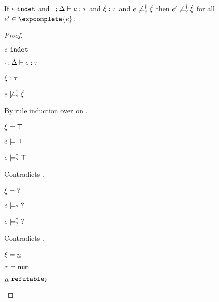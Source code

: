 \begin{lemma}
  \label{lem:complete-not-satormay}
  If $e ~\mathtt{indet}$ and $\cdot \mathbin{;} \Delta \vdash e : \tau$ and $\dot{\xi} : \tau$ and $e \not\models_{?}^{\dag} \dot{\xi}$
  then $e' \not\models_{?}^{\dag} \dot{\xi}$ for all $e'\in\expcomplete{e}$.
\end{lemma}
\begin{proof}
  \begin{pfsteps*}
  \item $e ~\mathtt{indet}$  
  \item $\cdot \mathbin{;} \Delta \vdash e : \tau$  
  \item $\dot{\xi} : \tau$  
  \item $e \not\models_{?}^{\dag} \dot{\xi}$  
  \end{pfsteps*}
  By rule induction over  on .
  \begin{byCases}
    \item[\text{(\ref{rule:CTTruth})}]
    \begin{pfsteps*}
    \item $\dot{\xi} = \top$ 
    \item $e \models \top$  
    \item $e \models_{?}^{\dag} \top$ 
    \end{pfsteps*}
    Contradicts .
    \item[\text{(\ref{rule:CTUnknown})}]
    \begin{pfsteps*}
    \item $\dot{\xi} = \mathtt{?}$ 
    \item $e \models_{?} \mathtt{?}$  
    \item $e \models_{?}^{\dag} \mathtt{?}$ 
    \end{pfsteps*}
    Contradicts .
    \item[\text{(\ref{rule:CTNum})}]
    \begin{pfsteps*}
    \item $\dot{\xi} = \underline{n}$ 
    \item $\tau = \mathtt{num}$ 
    \item $\underline{n} ~\mathtt{refutable}_?$  

\end{pfsteps*}
\end{byCases}
\end{proof}
